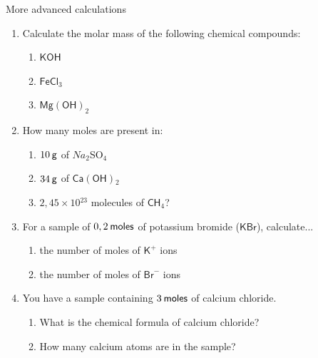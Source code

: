             \begin{exercises}{  More advanced calculations
      }
            \nopagebreak
      \label{m38717*id279756}\begin{enumerate}[noitemsep, label=\textbf{\arabic*}. ] 
            \label{m38717*uid47}\item Calculate the molar mass of the following chemical compounds:
\label{m38717*id279772}\begin{enumerate}[noitemsep, label=\textbf{\alph*}. ] 
            \label{m38717*uid48}\item $\mathsf{KOH}$
\label{m38717*uid49}\item $\mathsf{FeCl}{}_{3}$\label{m38717*uid50}\item ${\mathsf{Mg\left(OH\right)}}_{2}$\end{enumerate}
                \label{m38717*uid51}\item How many moles are present in:
\label{m38717*id279848}\begin{enumerate}[noitemsep, label=\textbf{\alph*}. ] 
            \label{m38717*uid52}\item $10\phantom{\rule{2pt}{0ex}}\mathsf{g}$ of $Na{}_{2}$SO${}_{4}$\label{m38717*uid53}\item $34\phantom{\rule{2pt}{0ex}}\mathsf{g}$ of $\mathsf{Ca\left(OH\right)}{}_{2}$\label{m38717*uid54}\item $2,45\ensuremath{\times}10{}^{23}$ molecules of $\mathsf{CH}{}_{4}$?
\end{enumerate}
                \label{m38717*uid55}\item For a sample of $0,2\phantom{\rule{2pt}{0ex}}\mathsf{moles}$ of potassium bromide ($\mathsf{KBr}$), calculate...
\label{m38717*id279964}\begin{enumerate}[noitemsep, label=\textbf{\alph*}. ] 
            \label{m38717*uid56}\item the number of moles of ${\mathsf{K}}^{+}$ ions
\label{m38717*uid57}\item the number of moles of ${\mathsf{Br}}^{-}$ ions
\end{enumerate}
                \label{m38717*uid58}\item You have a sample containing $3\phantom{\rule{2pt}{0ex}}\mathsf{moles}$ of calcium chloride.
\label{m38717*id280031}\begin{enumerate}[noitemsep, label=\textbf{\alph*}. ] 
            \label{m38717*uid59}\item What is the chemical formula of calcium chloride?
\label{m38717*uid60}\item How many calcium atoms are in the sample?

\end{enumerate}
\end{enumerate}
\end{exercises}
